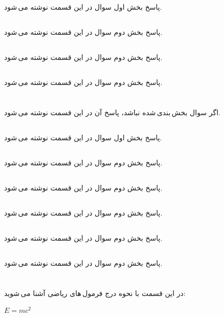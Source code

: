 \documentclass{article}
\begin{document}
\subsection{}
پاسخ بخش اول سوال در این قسمت نوشته می\,شود.
\subsection{}
پاسخ بخش دوم سوال در این قسمت نوشته می\,شود.
\subsection{}
پاسخ بخش دوم سوال در این قسمت نوشته می\,شود.
\subsection{}
پاسخ بخش دوم سوال در این قسمت نوشته می\,شود.

\section{}
اگر سوال بخش\,بندی\,شده نباشد، پاسخ آن در این قسمت نوشته می\,شود.
\subsection{}
پاسخ بخش اول سوال در این قسمت نوشته می\,شود.
\subsection{}
پاسخ بخش دوم سوال در این قسمت نوشته می\,شود.
\subsection{}
پاسخ بخش دوم سوال در این قسمت نوشته می\,شود.
\subsection{}
پاسخ بخش دوم سوال در این قسمت نوشته می\,شود.
\subsection{}
پاسخ بخش دوم سوال در این قسمت نوشته می\,شود.
\subsection{}
پاسخ بخش دوم سوال در این قسمت نوشته می\,شود.

\section{}
در این قسمت با نحوه درج فرمول\,های ریاضی آشنا می\,شوید:
\begin{center}
$E = m{c}^{2}$
\end{center}
\end{document}
